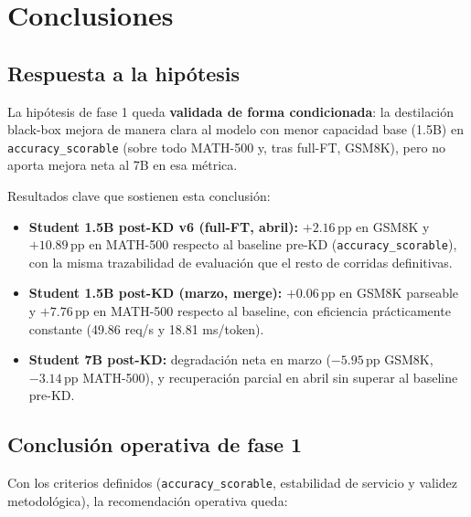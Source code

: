 \documentclass[11pt,a4paper]{article}
\begin{document}
\section{Conclusiones}
\label{sec:conclusions}

\subsection{Respuesta a la hip\'otesis}

La hip\'otesis de fase 1 queda \textbf{validada de forma condicionada}:
la destilaci\'on black-box mejora de manera clara al modelo con menor
capacidad base (1.5B) en \texttt{accuracy\_scorable} (sobre todo MATH-500
y, tras full-FT, GSM8K), pero no aporta mejora neta al 7B en esa m\'etrica.

Resultados clave que sostienen esta conclusi\'on:
\begin{itemize}
  \item \textbf{Student 1.5B post-KD v6 (full-FT, abril):}
    $\mathbf{+2.16}$\,pp en GSM8K y $\mathbf{+10.89}$\,pp en MATH-500
    respecto al baseline pre-KD (\texttt{accuracy\_scorable}), con la
    misma trazabilidad de evaluaci\'on que el resto de corridas
    definitivas.
  \item \textbf{Student 1.5B post-KD (marzo, merge):}
    $+0.06$\,pp en GSM8K parseable y $+7.76$\,pp en MATH-500 respecto al baseline,
    con eficiencia pr\'acticamente constante
    (49.86 req/s y 18.81 ms/token).
  \item \textbf{Student 7B post-KD:} degradaci\'on neta en marzo
    ($-5.95$\,pp GSM8K, $-3.14$\,pp MATH-500), y recuperaci\'on parcial en
    abril sin superar al baseline pre-KD.
\end{itemize}

\subsection{Conclusi\'on operativa de fase 1}

Con los criterios definidos (\texttt{accuracy\_scorable}, estabilidad de servicio y
validez metodol\'ogica), la recomendaci\'on operativa queda:
\end{document}
